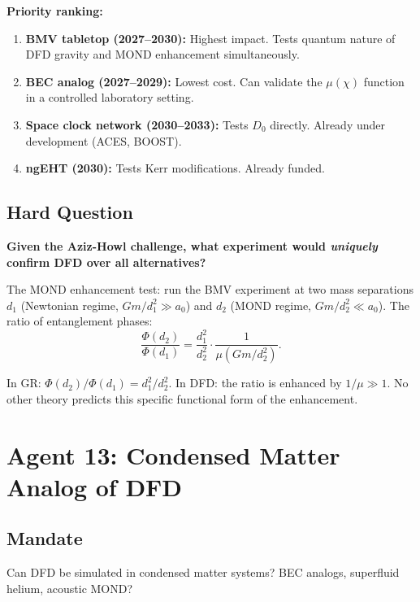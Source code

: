 \documentclass[11pt,a4paper]{article}
\begin{document}
\textbf{Priority ranking:}
\begin{enumerate}
\item \textbf{BMV tabletop (2027--2030):} Highest impact. Tests quantum nature of DFD gravity and MOND enhancement simultaneously.
\item \textbf{BEC analog (2027--2029):} Lowest cost. Can validate the $\mu(\chi)$ function in a controlled laboratory setting.
\item \textbf{Space clock network (2030--2033):} Tests $D_0$ directly. Already under development (ACES, BOOST).
\item \textbf{ngEHT (2030):} Tests Kerr modifications. Already funded.
\end{enumerate}

\subsection{Hard Question}

\textbf{Given the Aziz-Howl challenge, what experiment would \emph{uniquely} confirm DFD over all alternatives?}

The MOND enhancement test: run the BMV experiment at two mass separations $d_1$ (Newtonian regime, $Gm/d_1^2 \gg a_0$) and $d_2$ (MOND regime, $Gm/d_2^2 \ll a_0$). The ratio of entanglement phases:
\begin{equation}
\frac{\Phi(d_2)}{\Phi(d_1)} = \frac{d_1^2}{d_2^2}\cdot\frac{1}{\mu(Gm/d_2^2)}.
\end{equation}

In GR: $\Phi(d_2)/\Phi(d_1) = d_1^2/d_2^2$. In DFD: the ratio is enhanced by $1/\mu \gg 1$. No other theory predicts this specific functional form of the enhancement.

\newpage
\section{Agent 13: Condensed Matter Analog of DFD}
\label{sec:agent13}

\subsection{Mandate}

Can DFD be simulated in condensed matter systems? BEC analogs, superfluid helium, acoustic MOND?
\end{document}
